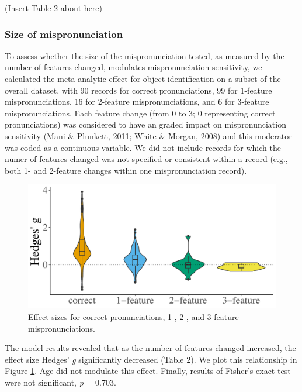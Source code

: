 \documentclass[man, noextraspace]{apa6}
\begin{document}
(Insert Table 2 about here)

\hypertarget{size-of-mispronunciation}{%
\subsubsection{Size of mispronunciation}\label{size-of-mispronunciation}}

To assess whether the size of the mispronunciation tested, as measured by the number of features changed, modulates mispronunciation sensitivity, we calculated the meta-analytic effect for object identification on a subset of the overall dataset, with 90 records for correct pronunciations, 99 for 1-feature mispronunciations, 16 for 2-feature mispronunciations, and 6 for 3-feature mispronunciations. Each feature change (from 0 to 3; 0 representing correct pronunciations) was considered to have an graded impact on mispronunciation sensitivity (Mani \& Plunkett, 2011; White \& Morgan, 2008) and this moderator was coded as a continuous variable. We did not include records for which the numer of features changed was not specified or consistent within a record (e.g., both 1- and 2-feature changes within one mispronunciation record).

\begin{figure}
\centering
\includegraphics{VonHolzenBergmann_MPMetaAnalysis_files/figure-latex/PlotFeatEffect-1.pdf}
\caption{\label{fig:PlotFeatEffect}Effect sizes for correct pronunciations, 1-, 2-, and 3-feature mispronunciations.}
\end{figure}

The model results revealed that as the number of features changed increased, the effect size Hedges' \emph{g} significantly decreased (Table 2). We plot this relationship in Figure \ref{fig:PlotFeatEffect}. Age did not modulate this effect. Finally, results of Fisher's exact test were not significant, \emph{p} = 0.703.
\end{document}
